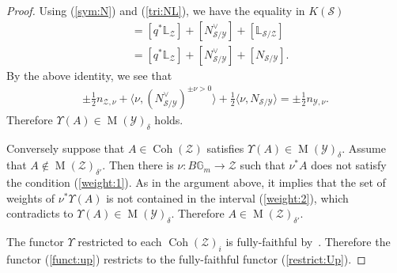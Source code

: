 \documentclass [11pt,oneside,a4paper,mathscr]{amsart}
\theoremstyle{definition}
\newcommand{\Y}{\mathcal{Y}}
\newcommand{\zZ}{\mathcal{Z}}
\newcommand{\MM}{\operatorname{M}}
\newcommand{\bgm}{B\mathbb{G}_m}
\newcommand{\Coh}{\operatorname{Coh}}
\begin{document}
\begin{proof}
	Using (\ref{sym:N}) and (\ref{tri:NL}), we have the equality in $K(\mathcal{S})$
	\begin{align*}
		[\mathbb{L}_{\mathcal{Y}}|_{\mathcal{S}}]
		&=[q^{\ast}\mathbb{L}_{\mathcal{Z}}]+[N_{\mathcal{S}/\mathcal{Y}}^{\vee}]+
		[\mathbb{L}_{\mathcal{S}/\mathcal{Z}}] \\
        &=[q^{\ast}\mathbb{L}_{\mathcal{Z}}]+[N_{\mathcal{S}/\mathcal{Y}}^{\vee}]+
		[N_{\mathcal{S}/\mathcal{Y}}]. 
		\end{align*}
	By the above identity, we see that 
	\begin{align*}
		\pm\frac{1}{2}n_{\mathcal{Z}, \nu}+\langle \nu, (N_{\mathcal{S}/\mathcal{Y}}^{\vee})^{\pm \nu>0} \rangle
		+\frac{1}{2}\langle \nu, N_{\mathcal{S}/\mathcal{Y}}\rangle
		=\pm \frac{1}{2}n_{\mathcal{Y}, \nu}.  
		\end{align*}
	Therefore $\Upsilon(A) \in \MM(\mathcal{Y})_{\delta}$ holds. 

 Conversely suppose that $A \in \Coh(\zZ)$ satisfies $\Upsilon(A) \in \MM(\Y)_{\delta}$. 
 Assume that $A \notin \MM(\zZ)_{\delta'}$. Then there is $\nu \colon \bgm \to \zZ$
 such that $\nu^{\ast}A$ does not satisfy the condition (\ref{weight:1}). As in the argument 
 above, it implies that the set of weights of $\nu^{\ast}\Upsilon(A)$ is not contained in the interval 
 (\ref{weight:2}), which contradicts to $\Upsilon(A) \in \MM(\Y)_{\delta}$. Therefore $A \in \MM(\zZ)_{\delta'}$. 

The functor $\Upsilon$ restricted to each $\Coh(\mathcal{Z})_{i}$ is fully-faithful 
	by~\cite[Theorem~3.3.1]{HalpK32}.
 Therefore the functor (\ref{funct:up}) restricts to the fully-faithful 
 functor (\ref{restrict:Up}). 
	\end{proof}
    
\end{document}
